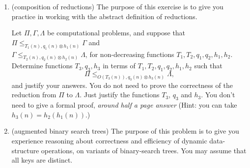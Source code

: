 \documentclass[11pt]{article}
\begin{document}
\begin{enumerate}
\begin{enumerate}
        \item (*challenge; extra credit; optional\footnote{This problem is meant to be done based on your enjoyment/interest and only if you have time. It won't make a difference between N, L, R-, and R grades (meaning it will only impact whether an R gets increased to an R+), and course staff will deprioritize questions about this problem at office hours and on Ed.})  Come up with a way to avoid conversion to polar coordinates and any other trigonometric functions in solving AreaOfConvexPolygon in time $O(n\log n)$.  Specifically, design an $O(n)$-time reduction that makes $O(1)$ calls to a Sorting oracle on arrays of length at most $n$, using only arithmetic operations $+$, $-$, $\times$, $\div$, and $\sqrt{\hspace{1em}}$, along with comparators like $<$ and $==$.  (Hint: first partition the input points according to which quadrant they belong in, and consider the slope of the line from a vertex (x,y) to the origin.) \label{part:nopolar}

    \end{enumerate}
    
    Similar techniques to what you are using in this problem are used in algorithms for other important geometric problems, like finding the Convex Hull of a set of points, which has applications in graphics and machine learning.

    \item (composition of reductions) 
    The purpose of this exercise is to give you practice in working with the abstract definition of reductions. 
    
    Let $\Pi, \Gamma, \Lambda$ be computational problems, and suppose that $\Pi\leq_{T_1(n),q_1(n)\otimes h_1(n)} \Gamma$ and \\ $\Gamma \leq_{T_2(n),q_2(n)\otimes h_2(n)} \Lambda$, for non-decreasing functions $T_1,T_2,q_1,q_2,h_1,h_2$.  Determine functions $T_3,q_3,h_3$ in terms of $T_1,T_2,q_1,q_2,h_1,h_2$ such that 
    $$\Pi \leq_{O(T_3(n)),q_3(n)\otimes h_3(n)} \Lambda,$$
    and justify your answers. You do not need to prove the correctness of the reduction from $\Pi$ to $\Lambda$. Just justify the functions $T_3$, $q_3$ and $h_3$. You don't need to give a formal proof, \textit{around half a page answer} (Hint: you can take $h_3(n)=h_2(h_1(n))$.) 

    \newpage

    \item (augmented binary search trees)
    The purpose of this problem is to give you experience reasoning about correctness and efficiency of dynamic data-structure operations, on variants of binary-search trees. You may assume that all keys are distinct.
    

\end{enumerate}
\end{document}
